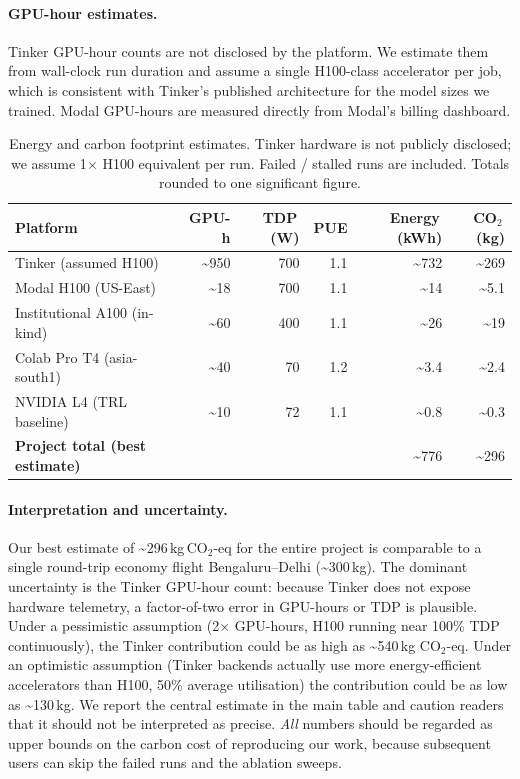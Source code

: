 \paragraph{GPU-hour estimates.}
Tinker GPU-hour counts are not disclosed by the platform. We estimate them
from wall-clock run duration and assume a single H100-class accelerator per
job, which is consistent with Tinker's published architecture for the
model sizes we trained. Modal GPU-hours are measured directly from Modal's
billing dashboard.

\begin{table}[ht]
\centering
\small
\caption{Energy and carbon footprint estimates. Tinker hardware is not
publicly disclosed; we assume 1$\times$ H100 equivalent per run. Failed /
stalled runs are included. Totals rounded to one significant figure.}
\label{tab:carbon2}
\begin{tabular}{lrrrrr}
\toprule
\textbf{Platform} & \textbf{GPU-h} & \textbf{TDP\,(W)} & \textbf{PUE} &
\textbf{Energy\,(kWh)} & \textbf{CO$_2$\,(kg)} \\
\midrule
Tinker (assumed H100)   & \textasciitilde 950 & 700 & 1.1 & \textasciitilde 732 & \textasciitilde 269 \\
Modal H100 (US-East)    & \textasciitilde 18  & 700 & 1.1 & \textasciitilde 14  & \textasciitilde 5.1 \\
Institutional A100 (in-kind)      & \textasciitilde 60  & 400 & 1.1 & \textasciitilde 26  & \textasciitilde 19   \\
Colab Pro T4 (asia-south1) & \textasciitilde 40 & 70 & 1.2 & \textasciitilde 3.4 & \textasciitilde 2.4  \\
NVIDIA L4 (TRL baseline)   & \textasciitilde 10 & 72 & 1.1 & \textasciitilde 0.8 & \textasciitilde 0.3  \\
\midrule
\textbf{Project total (best estimate)} & & & & \textasciitilde 776 & \textasciitilde 296 \\
\bottomrule
\end{tabular}
\end{table}

\paragraph{Interpretation and uncertainty.}
Our best estimate of \textasciitilde 296\,kg\,CO$_2$-eq for the entire
project is comparable to a single round-trip economy flight
Bengaluru--Delhi (\textasciitilde 300\,kg). The dominant uncertainty is
the Tinker GPU-hour count: because Tinker does not expose hardware telemetry,
a factor-of-two error in GPU-hours or TDP is plausible. Under a pessimistic
assumption (2$\times$ GPU-hours, H100 running near 100\% TDP continuously),
the Tinker contribution could be as high as \textasciitilde 540\,kg CO$_2$-eq.
Under an optimistic assumption (Tinker backends actually use more
energy-efficient accelerators than H100, 50\% average utilisation) the
contribution could be as low as \textasciitilde 130\,kg. We report the
central estimate in the main table and caution readers that it should not
be interpreted as precise. \emph{All} numbers should be regarded as upper
bounds on the carbon cost of reproducing our work, because subsequent
users can skip the failed runs and the ablation sweeps.

